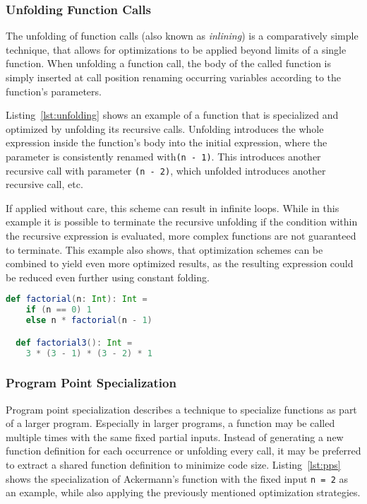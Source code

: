 \subsubsection*{Unfolding Function Calls}

The unfolding of function calls (also known as \textit{inlining}) is a comparatively simple technique, that allows for optimizations to be applied beyond limits of a single function.
When unfolding a function call, the body of the called function is simply inserted at call position renaming occurring variables according to the function's parameters.

Listing~\ref{lst:unfolding} shows an example of a function that is specialized and optimized by unfolding its recursive calls.
Unfolding introduces the whole expression inside the function's body into the initial expression, where the parameter is consistently renamed with\linebreak \texttt{(n - 1)}.
This introduces another recursive call with parameter \texttt{(n - 2)}, which unfolded introduces another recursive call, etc.

If applied without care, this scheme can result in infinite loops.
While in this example it is possible to terminate the recursive unfolding if the condition within the recursive expression is evaluated, more complex functions are not guaranteed to terminate.
This example also shows, that optimization schemes can be combined to yield even more optimized results, as the resulting expression could be reduced even further using constant folding.

\begin{lstlisting}[language=scala,caption={Definition of the \texttt{factorial} function and its specialization.},label={lst:unfolding}]
  def factorial(n: Int): Int =
    if (n == 0) 1
    else n * factorial(n - 1)

  def factorial3(): Int =
    3 * (3 - 1) * (3 - 2) * 1
\end{lstlisting}


\subsubsection*{Program Point Specialization}

Program point specialization describes a technique to specialize functions as part of a larger program.
Especially in larger programs, a function may be called multiple times with the same fixed partial inputs.
Instead of generating a new function definition for each occurrence or unfolding every call, it may be preferred to extract a shared function definition to minimize code size.
Listing~\ref{lst:pps} shows the specialization of Ackermann's function with the fixed input \texttt{n = 2} as an example, while also applying the previously mentioned optimization strategies.

